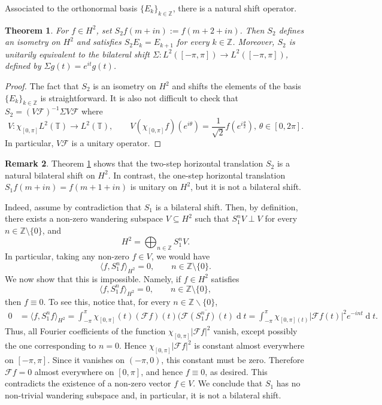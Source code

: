 \documentclass[12pt,a4paper,reqno]{amsart}
\newtheorem{thm}{Theorem}[section]
\theoremstyle{definition}
\newtheorem{rmk}[thm]{Remark}
\theoremstyle{definition}\newtheorem{defn}[thm]{Definition}
\begin{document}
    
    Associated to the orthonormal basis $\{E_k\}_{k\in\mathbb{Z}}$, there is a natural shift operator. 
    \begin{thm}\label{T:shift}
    For $f\in H^2$, set $S_2f(m+in):=f(m+2+in)$. Then $S_2$ defines an isometry on $H^2$ and satisfies $S_2E_k=E_{k+1}$ for every $k\in\mathbb Z$. Moreover, $S_2$ is unitarily equivalent to the bilateral shift $\Sigma:L^2([-\pi,\pi])\to L^2([-\pi,\pi])$, defined by $\Sigma g(t)=e^{it}g(t)$.
    \end{thm}
    \begin{proof}
    The fact that $S_2$ is an isometry on $H^2$ and shifts the elements of the basis $\{E_k\}_{k\in\mathbb Z}$ is straightforward.
    It is also not difficult to check that $S_2=(V\mathcal F)^{-1}\Sigma V\mathcal F$ where 
       \[V\colon \chi_{[0,\pi]}L^2(\mathbb{T})\to L^2(\mathbb{T}), \qquad  V(\chi_{[0,\pi]}f)(e^{i\theta})= \frac{1}{\sqrt{2}}f(e^{i\frac\theta2}), \,\theta\in[0,2\pi].\]
    In particular, $V\mathcal F$ is a unitary operator.
    \end{proof}
    
    \begin{rmk}
    Theorem \ref{T:shift} shows that the two-step horizontal translation $
    S_2$ is a natural bilateral shift on $H^2$. In contrast, the one-step horizontal
    translation
    \(
    S_1f(m+in)=f(m+1+in)
    \)
    is unitary on $H^2$, but it is not a bilateral shift.
    
    Indeed, assume by contradiction that $S_1$ is a bilateral shift. Then, by definition, there
    exists a non-zero wandering subspace \(V\subseteq H^2\) such that 
    \(
    S_1^nV\perp V
    \) for every $n\in\mathbb Z\setminus\{0\}$, and
    \[
    H^2=\bigoplus_{n\in\mathbb Z}S_1^nV.
    \]
    In particular, taking any non-zero \(f\in V\), we would have
    \[
    \langle f,S_1^nf\rangle_{H^2}=0,
    \qquad n\in\mathbb Z\setminus\{0\}.
    \]
    We now show that this is impossible. Namely, if $f\in H^2$ satisfies
    \[
    \langle f,S_1^nf\rangle_{H^2}=0,
    \qquad n\in\mathbb Z\setminus\{0\},
    \]
    then \(f\equiv0\). 
    To see this, notice that, for every $n\in\mathbb Z\backslash\{0\}$,
    \begin{align*}
    0&=\langle f, S^n_1 f\rangle_{H^2}=\int_{-\pi}^{\pi}\chi_{[0,\pi]}(t)(\mathcal F f)(t)\overline{(\mathcal F (S^n_1 f)(t)}\operatorname{d}\!t= \int_{-\pi}^{\pi}\chi_{[0,\pi](t)}|\mathcal Ff(t)|^2 e^{-int}\operatorname{d}\!t.   
    \end{align*}
    Thus, all Fourier coefficients of the function $\chi_{[0,\pi]}|\mathcal F f|^2$
    vanish, except possibly the one corresponding to \(n=0\). Hence
    \(\chi_{[0,\pi]}|\mathcal F f|^2\) is constant almost everywhere on
    $[-\pi,\pi]$. Since it vanishes on \((-\pi,0)\), this constant must be zero.
    Therefore \(\mathcal F f=0\) almost everywhere on \([0,\pi]\), and hence
    \(f\equiv0\), as desired. This contradicts the existence of a non-zero vector \(f\in V\). We conclude that \(S_1\) has no non-trivial wandering subspace and, in particular, it is not a bilateral shift.
    \end{rmk}
     
\end{document}
